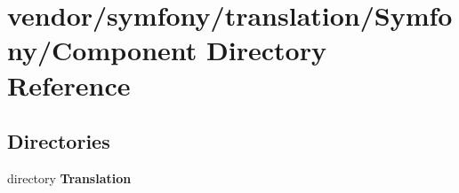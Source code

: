 \section{vendor/symfony/translation/\+Symfony/\+Component Directory Reference}
\label{dir_c652a2483f3c91d331eb57e5163a5142}
\subsection*{Directories}
\begin{DoxyCompactItemize}
\item 
directory {\bf Translation}
\end{DoxyCompactItemize}
